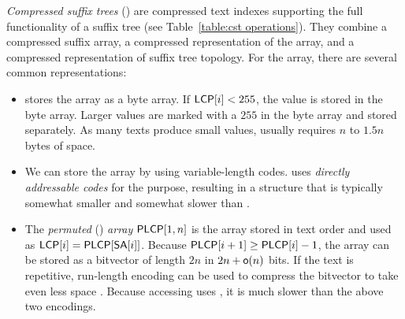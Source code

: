 \emph{Compressed suffix trees} (\CST) \cite{Sadakane2007} are compressed text
indexes supporting the full functionality of a suffix tree (see
Table~\ref{table:cst operations}). They combine a compressed suffix array, a
compressed representation of the \LCP{} array, and a compressed representation
of suffix tree topology. For the \LCP{} array, there are several common
representations:
\begin{itemize}
\item \LCPbyte{} \cite{Abouelhoda2004} stores the \LCP{} array as a byte
array. If $\mathsf{LCP}[i] < 255$, the \LCP{} value is stored in the byte array.
Larger values are marked with a $255$ in the byte array and stored separately.
As many texts produce small \LCP{} values, \LCPbyte{} usually requires
$n$ to $1.5n$ bytes of space.
\item We can store the \LCP{} array by using variable-length codes. \LCPdac{}
uses \emph{directly addressable codes} \cite{Brisaboa2009} for the purpose,
resulting in a structure that is typically somewhat smaller and somewhat
slower than \LCPbyte.
\item The \emph{permuted} \LCP{} (\PLCP) \emph{array} \cite{Sadakane2007}
$\mathsf{PLCP}[1,n]$ is the \LCP{} array stored in text order and used as $\mathsf{LCP}[i] =
\mathsf{PLCP}[\mathsf{SA}[i]]$. Because $\mathsf{PLCP}[i+1] \ge \mathsf{PLCP}[i]-1$, the array can be
stored as a bitvector of length $2n$ in $2n+\mathsf{o}(n)$ bits. If the text is
repetitive, run-length encoding can be used to compress the bitvector to take
even less space \cite{Fischer2009a}. Because accessing \PLCP{} uses \locate,
it is much slower than the above two encodings.
\end{itemize}

